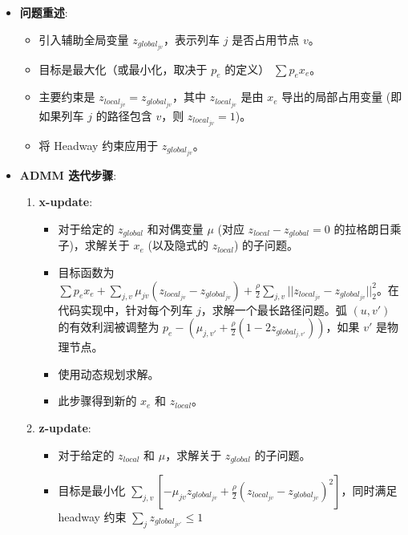 \documentclass{article}
\begin{document}
    \begin{itemize}
        \item \textbf{问题重述}:
        \begin{itemize}
            \item 引入辅助全局变量 $z_{global_{jv}}$，表示列车 $j$ 是否占用节点 $v$。
            \item 目标是最大化（或最小化，取决于 $p_e$ 的定义） $\sum p_e x_e$。
            \item 主要约束是 $z_{local_{jv}} = z_{global_{jv}}$，其中
            $z_{local_{jv}}$ 是由 $x_e$ 导出的局部占用变量 (即如果列车 $j$ 的路径包含
            $v$，则 $z_{local_{jv}}=1$)。
            \item 将 Headway 约束应用于 $z_{global_{jv}}$。
        \end{itemize}
        \item \textbf{ADMM 迭代步骤}:
        \begin{enumerate}
            \item \textbf{x-update}:
            \begin{itemize}
                \item 对于给定的 $z_{global}$ 和对偶变量 $\mu$ (对应
                $z_{local} - z_{global} = 0$ 的拉格朗日乘子)，求解关于
                $x_e$ (以及隐式的 $z_{local}$) 的子问题。
                \item 目标函数为 $\sum p_e x_e + \sum_{j,v} \mu_{jv}
                (z_{local_{jv}} - z_{global_{jv}}) +
                \frac{\rho}{2} \sum_{j,v} ||z_{local_{jv}} -
                z_{global_{jv}}||_2^2$。在代码实现中，针对每个列车
                $j$，求解一个最长路径问题。弧 $(u,v')$ 的有效利润被调整为 $p_e -
                (\mu_{j,v'} + \frac{\rho}{2} (1 - 2
                z_{global_{j,v'}}))$，如果 $v'$ 是物理节点。
                \item 使用动态规划求解。
                \item 此步骤得到新的 $x_e$ 和 $z_{local}$。
            \end{itemize}
            \item \textbf{z-update}:
            \begin{itemize}
                \item 对于给定的 $z_{local}$ 和 $\mu$，求解关于 $z_{global}$ 的子问题。
                \item 目标是最小化 $\sum_{j,v} [-\mu_{jv}
                z_{global_{jv}} + \frac{\rho}{2}
                (z_{local_{jv}} - z_{global_{jv}})^2]$，同时满足
                headway 约束 $\sum_{j} z_{global_{jv'}} \le 1$

\end{itemize}
\end{enumerate}
\end{itemize}
\end{document}
